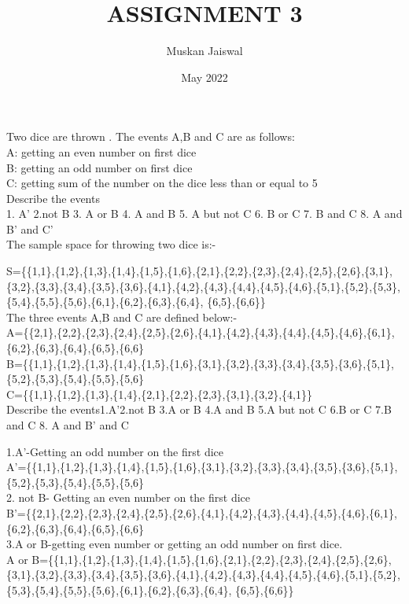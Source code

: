 \documentclass{article}
\title{ASSIGNMENT 3}
\author{Muskan Jaiswal}
\date{May 2022}
\begin{document}
\maketitle

\section{}Two dice are thrown . The events A,B and C are as follows:\\
A: getting an even number on first dice\\
B: getting an odd number on first dice\\
C: getting sum of the number on the dice less than or equal to 5\\
Describe the events\\
1. A' 2.not B 3.  A or B 4. A and B 5. A but not C 6. B or C 7. B and C  8. A and B' and C'        \\
  The sample space for throwing two dice is:-

S=\{\{1,1\},\{1,2\},\{1,3\},\{1,4\},\{1,5\},\{1,6\},\{2,1\},\{2,2\},\{2,3\},\{2,4\},\{2,5\},\{2,6\},\{3,1\},\{3,2\},\{3,3\},\{3,4\},\{3,5\},\{3,6\},\{4,1\},\{4,2\},\{4,3\},\{4,4\},\{4,5\},\{4,6\},\{5,1\},\{5,2\},\{5,3\},\{5,4\},\{5,5\},\{5,6\},\{6,1\},\{6,2\},\{6,3\},\{6,4\},
\{6,5\},\{6,6\}\}\\

The three events A,B and C are defined below:-\\

A=\{\{2,1\},\{2,2\},\{2,3\},\{2,4\},\{2,5\},\{2,6\},\{4,1\},\{4,2\},\{4,3\},\{4,4\},\{4,5\},\{4,6\},\{6,1\},\{6,2\},\{6,3\},\{6,4\},\{6,5\},\{6,6\}\\
B=\{\{1,1\},\{1,2\},\{1,3\},\{1,4\},\{1,5\},\{1,6\},\{3,1\},\{3,2\},\{3,3\},\{3,4\},\{3,5\},\{3,6\},\{5,1\},\{5,2\},\{5,3\},\{5,4\},\{5,5\},\{5,6\}\\
C=\{\{1,1\},\{1,2\},\{1,3\},\{1,4\},\{2,1\},\{2,2\},\{2,3\},\{3,1\},\{3,2\},\{4,1\}\}\\


Describe the events1.A'2.not B 3.A or B 4.A and B 5.A but not C 6.B or C 7.B and C 8. A and B' and C


1.A'-Getting an odd number on the first dice\\
A'=\{\{1,1\},\{1,2\},\{1,3\},\{1,4\},\{1,5\},\{1,6\},\{3,1\},\{3,2\},\{3,3\},\{3,4\},\{3,5\},\{3,6\},\{5,1\},\{5,2\},\{5,3\},\{5,4\},\{5,5\},\{5,6\}\\
2. not B- Getting an even number on the first dice\\
B'=\{\{2,1\},\{2,2\},\{2,3\},\{2,4\},\{2,5\},\{2,6\},\{4,1\},\{4,2\},\{4,3\},\{4,4\},\{4,5\},\{4,6\},\{6,1\},\{6,2\},\{6,3\},\{6,4\},\{6,5\},\{6,6\}\\
3.A or B-getting even number or getting an odd number on first dice.\\
A or B=\{\{1,1\},\{1,2\},\{1,3\},\{1,4\},\{1,5\},\{1,6\},\{2,1\},\{2,2\},\{2,3\},\{2,4\},\{2,5\},\{2,6\},\{3,1\},\{3,2\},\{3,3\},\{3,4\},\{3,5\},\{3,6\},\{4,1\},\{4,2\},\{4,3\},\{4,4\},\{4,5\},\{4,6\},\{5,1\},\{5,2\},\{5,3\},\{5,4\},\{5,5\},\{5,6\},\{6,1\},\{6,2\},\{6,3\},\{6,4\},
\{6,5\},\{6,6\}\}
\end{document}
